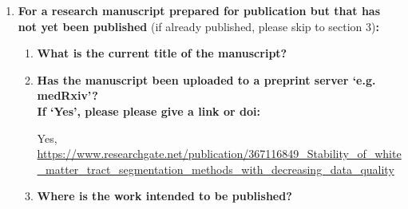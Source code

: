 {\begin{enumerate}[leftmargin=*,label={\bfseries\arabic*.}]
\begin{enumerate}[label={\alph*)}]
	\item \textbf{Please include a link to or doi for the work:}

	\item \textbf{Where was the work published?}

	\item \textbf{Who published the work?}

	\item \textbf{When was the work published?}

	\item \textbf{List the manuscript's authors in the order they appear on the publication:}

	\item \textbf{Was the work peer reviewd?}

	\item \textbf{Have you retained the copyright?}

	\item \textbf{Was an earlier form of the manuscript uploaded to a preprint server (e.g. medRxiv)? If ‘Yes’, please give a link or doi}
	\\
	If ‘No’, please seek permission from the relevant publisher and check the box next to the below statement:
\begin{itemize}\itemsep0em
\item[$\Box$] {\itshape I acknowledge permission of the publisher named under 1d to include in this thesis portions of the publication named as included in 1c.}
\end{itemize}
%
\end{enumerate}
%
\item \textbf{For a research manuscript prepared for publication but that has not yet been published} (if already published, please skip to section 3)\textbf{:}
%
\begin{enumerate}[label={\alph*)}]\itemsep0em
	\item \textbf{What is the current title of the manuscript?}

	\item \textbf{Has the manuscript been uploaded to a preprint server `e.g. medRxiv'?
	\\
	If `Yes', please please give a link or doi:}

	Yes, \url{https://www.researchgate.net/publication/367116849_Stability_of_white_matter_tract_segmentation_methods_with_decreasing_data_quality}
	\item \textbf{Where is the work intended to be published?}


\end{enumerate}
\end{enumerate}}
